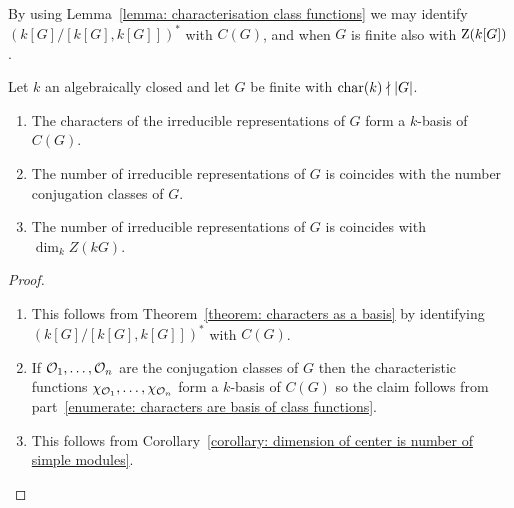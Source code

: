 \begin{fluff}
  By using Lemma~\ref{lemma: characterisation class functions} we may identify $(k[G]/[k[G], k[G]])^*$ with $C(G)$, and when $G$ is finite also with $\operatorname{Z}(k[G])$.
\end{fluff}




\begin{proposition}
  \label{proposition: conjugation classes and irreducible representations}
  Let $k$ an algebraically closed and let $G$ be finite with $\operatorname{char}(k) \nmid |G|$.
  \begin{enumerate}
    \item
      \label{enumerate: characters are basis of class functions}
     The characters of the irreducible representations of $G$ form a $k$-basis of $C(G)$.
    \item
      \label{enumerate: number of irr rep is number of conjugacy classes}
      The number of irreducible representations of $G$ is coincides with the number conjugation classes of $G$.
    \item
      \label{enumerate: number of irr rep is dim of center}
      The number of irreducible representations of $G$ is coincides with $\dim_k Z(kG)$.
  \end{enumerate}
\end{proposition}


\begin{proof}
  \leavevmode
  \begin{enumerate}
    \item
      This follows from Theorem~\ref{theorem: characters as a basis} by identifying $(k[G]/[k[G], k[G]])^*$ with $C(G)$.
    \item
      If $\mathcal{O}_1, \dotsc, \mathcal{O}_n$ are the conjugation classes of $G$ then the characteristic functions $\chi_{\mathcal{O}_1}, \dotsc, \chi_{\mathcal{O}_n}$ form a $k$-basis of $C(G)$ so the claim follows from part~\ref*{enumerate: characters are basis of class functions}.
    \item
      This follows from Corollary~\ref{corollary: dimension of center is number of simple modules}.
    \qedhere
  \end{enumerate}
\end{proof}



